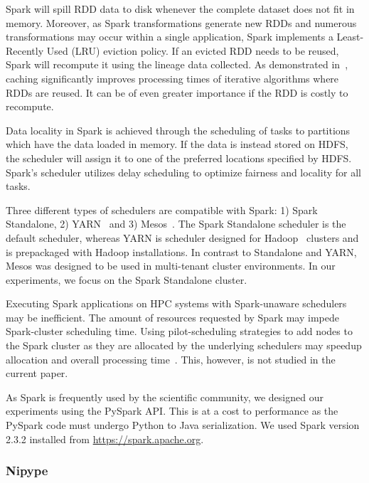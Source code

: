 \documentclass{IEEEtran}
\begin{document}
Spark will spill RDD data to disk whenever the complete dataset does not fit in
memory. Moreover, as Spark transformations generate new RDDs and numerous 
transformations may occur within a single application, Spark implements a
Least-Recently Used (LRU) eviction
policy. If an evicted RDD needs to be reused, Spark will recompute it using the
lineage data collected. As demonstrated in~\cite{freeman2014mapping}, caching significantly improves processing times of iterative algorithms where 
RDDs are reused. It can be of even greater importance if the RDD is costly to 
recompute.

Data locality in Spark is achieved through the scheduling of tasks to partitions 
which have the
data loaded in memory. If the data is instead stored on HDFS, the scheduler will
assign it to one of the preferred locations specified by HDFS. Spark's scheduler
utilizes delay scheduling to optimize fairness and locality for all tasks.

Three different types of schedulers are compatible with Spark: 1) Spark 
Standalone, 2) YARN~\cite{vavilapalli2013apache} and 3) Mesos~\cite{hindman2011mesos}. The Spark Standalone
scheduler is the default scheduler, whereas YARN is scheduler designed for Hadoop~\cite{white2012hadoop}
clusters and is prepackaged with Hadoop installations. In contrast to Standalone and YARN, 
Mesos was designed to be used in multi-tenant cluster environments. In our experiments,
we focus on the Spark Standalone cluster.

Executing Spark applications on HPC systems with Spark-unaware schedulers may
be inefficient. The amount of resources requested by Spark may impede 
Spark-cluster scheduling time. Using pilot-scheduling strategies to add 
nodes to the Spark cluster as they are allocated by the underlying 
schedulers may speedup allocation and overall processing time~\cite{paraskevakos2018pilot}. This, however, is not studied in the 
current paper.

As Spark is frequently used by the scientific community, we designed 
our experiments using the PySpark API. This is at a cost to performance 
as the PySpark code must undergo Python to Java serialization. We used Spark
version 2.3.2 installed from \url{https://spark.apache.org}.

\subsubsection{Nipype}
\end{document}

